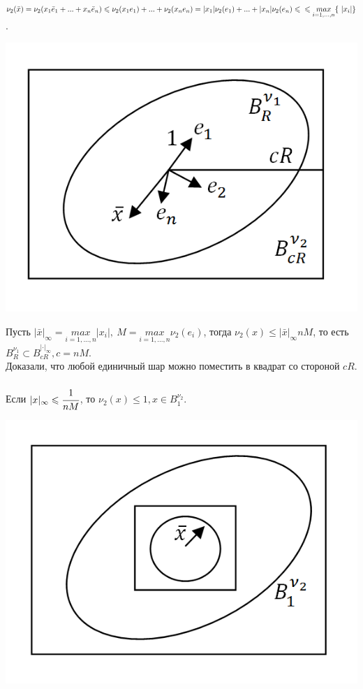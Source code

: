 \documentclass[12pt]{article}
\theoremstyle{definition}
\numberwithin{equation}{section}
\begin{document}
$\nu_2(\bar x) = \nu_2 (x_1 \bar e_1 +...+x_n \bar e_n) \leqslant \nu_2(x_1e_1)+...+\nu_2(x_ne_n) = |x_1|\nu_2(e_1)+...+|x_n|\nu_2(e_n) \leqslant \\ \leqslant \underset{i=1,...,n}{max} \{\ |x_i|\}$.\begin{center}
\includegraphics[scale=0.5]{l5_5.png}\end{center}
Пусть $|\bar x|_{\infty} = \underset{i=1,...,n}{max}|x_i|, ~M = \underset{i=1,...,n}{max}\nu_2(e_i)$, тогда $\nu_2(x) \leqslant |\bar x|_{\infty}nM$, то есть $B_R^{\nu_1} \subset B_{cR}^{|\cdot |_{\infty}}, c = nM$.\\
Доказали, что любой единичный шар можно поместить в квадрат со стороной $cR$.\\
\\
Если $|x|_{\infty} \leqslant \cfrac{1}{nM}$, то $\nu_2(x) \leqslant 1, x \in B_1^{\nu_2}$.\begin{center} \includegraphics[scale=0.5]{l5_6.png}\end{center}
\end{document}
